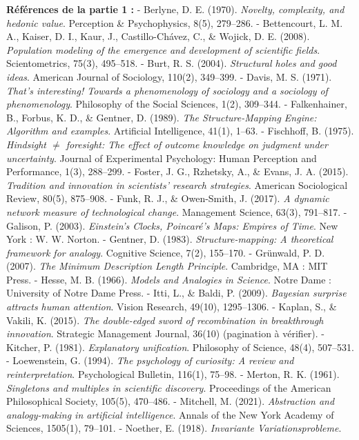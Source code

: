 \documentclass[a4paper,11pt]{article}
\begin{document}
\textbf{Références de la partie 1 :} - Berlyne, D. E. (1970).
\emph{Novelty, complexity, and hedonic value}. Perception \&
Psychophysics, 8(5), 279--286. - Bettencourt, L. M. A., Kaiser, D. I.,
Kaur, J., Castillo-Chávez, C., \& Wojick, D. E. (2008). \emph{Population
modeling of the emergence and development of scientific fields}.
Scientometrics, 75(3), 495--518. - Burt, R. S. (2004). \emph{Structural
holes and good ideas}. American Journal of Sociology, 110(2), 349--399.
- Davis, M. S. (1971). \emph{That's interesting! Towards a phenomenology
of sociology and a sociology of phenomenology}. Philosophy of the Social
Sciences, 1(2), 309--344. - Falkenhainer, B., Forbus, K. D., \& Gentner,
D. (1989). \emph{The Structure-Mapping Engine: Algorithm and examples}.
Artificial Intelligence, 41(1), 1--63. - Fischhoff, B. (1975).
\emph{Hindsight \ensuremath{\neq} foresight: The effect of outcome knowledge on judgment
under uncertainty}. Journal of Experimental Psychology: Human Perception
and Performance, 1(3), 288--299. - Foster, J. G., Rzhetsky, A., \&
Evans, J. A. (2015). \emph{Tradition and innovation in scientists'
research strategies}. American Sociological Review, 80(5), 875--908. -
Funk, R. J., \& Owen-Smith, J. (2017). \emph{A dynamic network measure
of technological change}. Management Science, 63(3), 791--817. -
Galison, P. (2003). \emph{Einstein's Clocks, Poincaré's Maps: Empires of
Time}. New York : W. W. Norton. - Gentner, D. (1983).
\emph{Structure-mapping: A theoretical framework for analogy}. Cognitive
Science, 7(2), 155--170. - Grünwald, P. D. (2007). \emph{The Minimum
Description Length Principle}. Cambridge, MA : MIT Press. - Hesse, M. B.
(1966). \emph{Models and Analogies in Science}. Notre Dame : University
of Notre Dame Press. - Itti, L., \& Baldi, P. (2009). \emph{Bayesian
surprise attracts human attention}. Vision Research, 49(10), 1295--1306.
- Kaplan, S., \& Vakili, K. (2015). \emph{The double-edged sword of
recombination in breakthrough innovation}. Strategic Management Journal,
36(10) (pagination à vérifier). - Kitcher, P. (1981). \emph{Explanatory
unification}. Philosophy of Science, 48(4), 507--531. - Loewenstein, G.
(1994). \emph{The psychology of curiosity: A review and
reinterpretation}. Psychological Bulletin, 116(1), 75--98. - Merton, R.
K. (1961). \emph{Singletons and multiples in scientific discovery}.
Proceedings of the American Philosophical Society, 105(5), 470--486. -
Mitchell, M. (2021). \emph{Abstraction and analogy-making in artificial
intelligence}. Annals of the New York Academy of Sciences, 1505(1),
79--101. - Noether, E. (1918). \emph{Invariante Variationsprobleme}.
\end{document}

